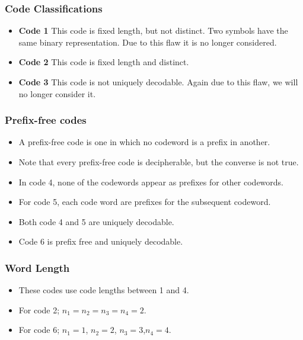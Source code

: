 \begin{frame}
\frametitle{Code Classifications}
\begin{itemize}
\item \textbf{Code 1} This code is fixed length, but not distinct. Two symbols have the same binary representation. Due to this flaw it is no longer considered.
\item \textbf{Code 2} This code is fixed length and distinct. 
\item \textbf{Code 3} This code is not uniquely decodable. Again due to this flaw, we will no longer consider it.

\end{itemize}
\end{frame}
\begin{frame}
\frametitle{Prefix-free codes}
\begin{itemize}
\item A prefix-free code is one in which no codeword is a prefix in another. \item Note that every prefix-free code is decipherable, but the converse is not true. 
    \item In code 4, none of the codewords appear as prefixes for other codewords.
\item For code 5, each code word are prefixes for the subsequent codeword.
\item Both code 4 and 5 are uniquely decodable.
\item Code 6 is prefix free and uniquely decodable.
\end{itemize}
\end{frame}
\begin{frame}
\frametitle{Word Length}
\begin{itemize}
\item These codes use code lengths between 1 and 4.
\item For code 2; $n_1 = n_2 = n_3 = n_4 = 2$.
\item For code 6; $n_1 = 1$, $n_2 = 2$, $n_3 = 3$,$n_4 = 4$.
\end{itemize}
\end{frame}
